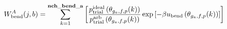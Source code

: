 \documentclass[12pt]{article}
\begin{document}
\begin{displaymath}
W_{\rm bend}^{A}(j,b) = 
\sum_{k=1}^{\bf nch\_bend\_a}
\left[
{{p_{\rm trial}^{\rm ideal}\left(\theta_{g_a,f,p}(k)\right)}\over{ p_{\rm trial}^{\rm arb}\left(\theta_{g_a,f,p}(k)\right)}}
\exp\left[-\beta u_{\rm bend}\left(\theta_{g_a,f,p}(k)\right)\right]
\right]
\end{displaymath}
\end{document}
